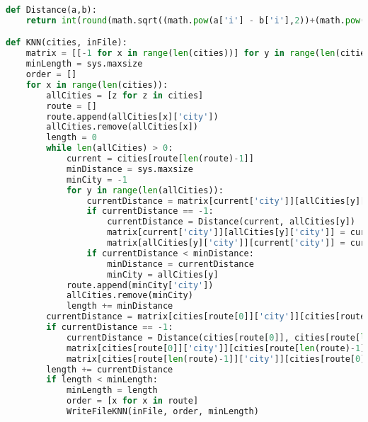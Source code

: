 \begin{lstlisting}[language=Python]
def Distance(a,b):
    return int(round(math.sqrt((math.pow(a['i'] - b['i'],2))+(math.pow(a['j'] - b['j'],2)))))

def KNN(cities, inFile):
    matrix = [[-1 for x in range(len(cities))] for y in range(len(cities))]
    minLength = sys.maxsize
    order = []
    for x in range(len(cities)):
        allCities = [z for z in cities]
        route = []
        route.append(allCities[x]['city'])
        allCities.remove(allCities[x])
        length = 0
        while len(allCities) > 0:
            current = cities[route[len(route)-1]]
            minDistance = sys.maxsize
            minCity = -1
            for y in range(len(allCities)):
                currentDistance = matrix[current['city']][allCities[y]['city']]
                if currentDistance == -1:
                    currentDistance = Distance(current, allCities[y])
                    matrix[current['city']][allCities[y]['city']] = currentDistance
                    matrix[allCities[y]['city']][current['city']] = currentDistance
                if currentDistance < minDistance:
                    minDistance = currentDistance
                    minCity = allCities[y]
            route.append(minCity['city'])
            allCities.remove(minCity)
            length += minDistance
        currentDistance = matrix[cities[route[0]]['city']][cities[route[len(route)-1]]['city']]
        if currentDistance == -1:
            currentDistance = Distance(cities[route[0]], cities[route[len(route)-1]])
            matrix[cities[route[0]]['city']][cities[route[len(route)-1]]['city']] = currentDistance
            matrix[cities[route[len(route)-1]]['city']][cities[route[0]]['city']] = currentDistance
        length += currentDistance
        if length < minLength:
            minLength = length
            order = [x for x in route]
            WriteFileKNN(inFile, order, minLength)
\end{lstlisting}
